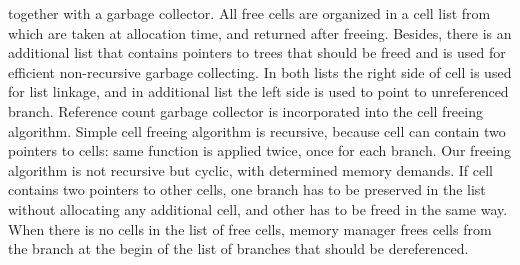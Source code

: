 \documentclass{article}
\begin{document}
together with a garbage collector. All free cells are organized in a
cell list from which are taken at allocation time, and returned after
freeing. Besides, there is an additional list that contains pointers
to trees that should be freed and is used for efficient non-recursive
garbage collecting. In both lists the right side of cell is used for
list linkage, and in additional list the left side is used to point
to unreferenced branch. Reference count garbage collector is
incorporated into the cell freeing algorithm. Simple cell freeing
algorithm is recursive, because cell can contain two pointers to cells:
same function is applied twice, once for each branch. Our freeing
algorithm is not recursive but cyclic, with determined memory demands.
If cell contains two pointers to other cells, one branch has to be
preserved in the list without allocating any additional cell, and
other has to be freed in the same way.
When there is no cells in the list of free cells, memory manager
frees cells from the branch at the begin of the list of branches
that should be dereferenced.
\end{document}
